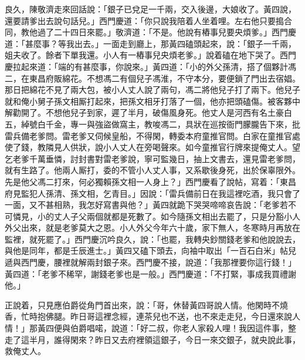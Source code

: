 良久，陳敬濟走來回話說：「銀子已兌足一千兩，交入後邊，大娘收了。黃四說，還要請爹出去說句話兒。」西門慶道：「你只說我陪着人坐着哩。左右他只要搗合同，教他過了二十四日來罷。」敬濟道：「不是。他說有樁事兒要央煩爹。」西門慶道：「甚麼事？等我出去。」一面走到廳上，那黃四磕頭起來，說：「銀子一千兩，姐夫收了。餘者下單我還。小人有一樁事兒央煩老爹。」說着磕在地下哭了。西門慶拉起來道：「端的有甚麼事，你說來。」黃四道：「小的外父孫清，搭了個夥計馮二，在東昌府販綿花。不想馮二有個兒子馮淮，不守本分，要便鎖了門出去宿娼。那日把綿花不見了兩大包，被小人丈人說了兩句，馮二將他兒子打了兩下。他兒子就和俺小舅子孫文相厮打起來，把孫文相牙打落了一個，他亦把頭磕傷。被客夥中解勸開了。不想他兒子到家，遲了半月，破傷風身死。他丈人是河西有名土豪白五，綽號白千金，專一與強盜做窩主，教唆馮二，具狀在巡按衙門朦朧告下來，批雷兵備老爹問。雷老爹又伺候皇船，不得閑，轉委本府童推官問。白家在童推官處使了錢，教隣見人供狀，說小人丈人在旁喝聲來。如今童推官行牌來提俺丈人。望乞老爹千萬垂憐，討封書對雷老爹說，寧可監幾日，抽上文書去，還見雷老爹問，就有生路了。他兩人厮打，委的不管小人丈人事，又系歇後身死，出於保辜限外。先是他父馮二打來，何必獨賴孫文相一人身上？」西門慶看了說帖，寫着：「東昌府見監犯人孫清、孫文相，乞青目。」因說：「雷兵備前日在我這裡吃酒，我只會了一面，又不甚相熟，我怎好寫書與他？」黃四就跪下哭哭啼啼哀告說：「老爹若不可憐見，小的丈人子父兩個就都是死數了。如今隨孫文相出去罷了，只是分豁小人外父出來，就是老爹莫大之恩。小人外父今年六十歲，家下無人，冬寒時月再放在監裡，就死罷了。」西門慶沉吟良久，說：「也罷，我轉央鈔關錢老爹和他說說去，與他是同年，都是壬辰進士。」黃四又磕下頭去，向袖中取出「一百石白米」帖兒遞與西門慶，腰裡就解兩封銀子來。西門慶不接，說道：「我那裡要你這行錢！」黃四道：「老爹不稀罕，謝錢老爹也是一般。」西門慶道：「不打緊，事成我買禮謝他。」

正說着，只見應伯爵從角門首出來，說：「哥，休替黃四哥說人情。他閑時不燒香，忙時抱佛腿。{}昨日哥這裡念經，連茶兒也不送，也不來走走兒，今日還來說人情！」那黃四便與伯爵唱喏，說道：「好二叔，你老人家殺人哩！{}我因這件事，整走了這半月，誰得閑來？昨日又去府裡領這銀子，今日一來交銀子，就央說此事，救俺丈人。

